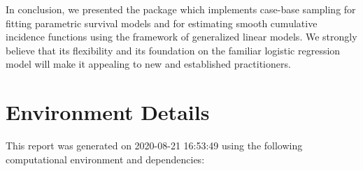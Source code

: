 \documentclass[
]{jss}
\begin{document}
In conclusion, we presented the  package 
which implements case-base sampling for fitting parametric survival
models and for estimating smooth cumulative incidence functions using
the framework of generalized linear models. We strongly believe that its
flexibility and its foundation on the familiar logistic regression model
will make it appealing to new and established practitioners.

\hypertarget{environment-details}{%
\section{Environment Details}\label{environment-details}}

This report was generated on 2020-08-21 16:53:49 using the following
computational environment and dependencies:
\end{document}
